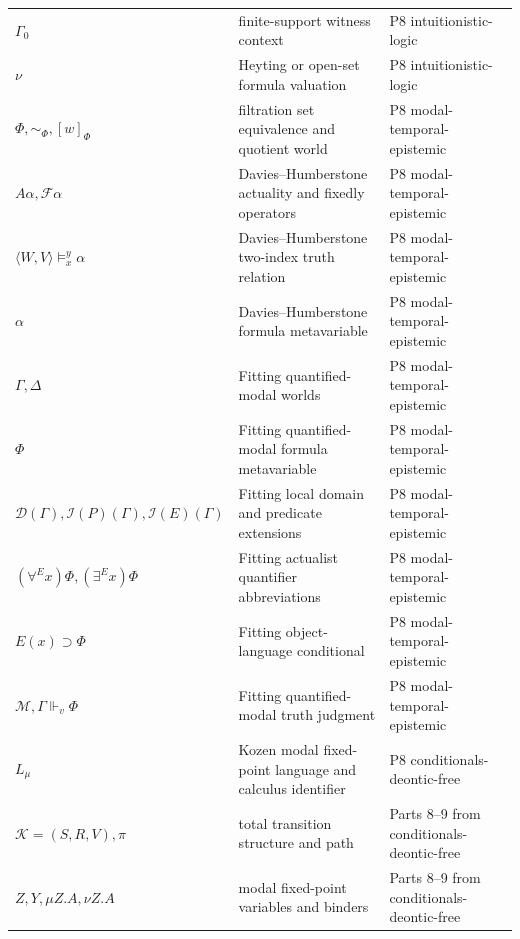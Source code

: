 \begin{longtable}{@{}p{}p{}p{}@{}}
\(\Gamma_0\) & finite-support witness context & P8 intuitionistic-\allowbreak{}logic \\
\(\nu\) & Heyting or open-set formula valuation & P8 intuitionistic-\allowbreak{}logic \\
\(\Phi,\allowbreak \sim_{\Phi},\allowbreak [w]_{\Phi}\) & filtration set equivalence and quotient world & P8 modal-\allowbreak{}temporal-\allowbreak{}epistemic \\
\(A\alpha,\allowbreak \mathcal F\alpha\) & Davies--Humberstone actuality and fixedly operators & P8 modal-\allowbreak{}temporal-\allowbreak{}epistemic \\
\(\langle W,\allowbreak V\rangle\models_x^y\alpha\) & Davies--Humberstone two-index truth relation & P8 modal-\allowbreak{}temporal-\allowbreak{}epistemic \\
\(\alpha\) & Davies--Humberstone formula metavariable & P8 modal-\allowbreak{}temporal-\allowbreak{}epistemic \\
\(\Gamma,\allowbreak \Delta\) & Fitting quantified-modal worlds & P8 modal-\allowbreak{}temporal-\allowbreak{}epistemic \\
\(\Phi\) & Fitting quantified-modal formula metavariable & P8 modal-\allowbreak{}temporal-\allowbreak{}epistemic \\
\(\mathcal D(\Gamma),\allowbreak \mathcal I(P)(\Gamma),\allowbreak \mathcal I(E)(\Gamma)\) & Fitting local domain and predicate extensions & P8 modal-\allowbreak{}temporal-\allowbreak{}epistemic \\
\((\forall^E x)\Phi,\allowbreak (\exists^E x)\Phi\) & Fitting actualist quantifier abbreviations & P8 modal-\allowbreak{}temporal-\allowbreak{}epistemic \\
\(E(x)\supset\Phi\) & Fitting object-language conditional & P8 modal-\allowbreak{}temporal-\allowbreak{}epistemic \\
\(\mathcal M,\allowbreak \Gamma\Vdash_v\Phi\) & Fitting quantified-modal truth judgment & P8 modal-\allowbreak{}temporal-\allowbreak{}epistemic \\
\(L_{\mu}\) & Kozen modal fixed-point language and calculus identifier & P8 conditionals-\allowbreak{}deontic-\allowbreak{}free \\
\(\mathcal K=(S,\allowbreak R,\allowbreak V),\allowbreak \pi\) & total transition structure and path & Parts 8--9 from conditionals-\allowbreak{}deontic-\allowbreak{}free \\
\(Z,\allowbreak Y,\allowbreak \mu Z.A,\allowbreak \nu Z.A\) & modal fixed-point variables and binders & Parts 8--9 from conditionals-\allowbreak{}deontic-\allowbreak{}free \\

\end{longtable}
